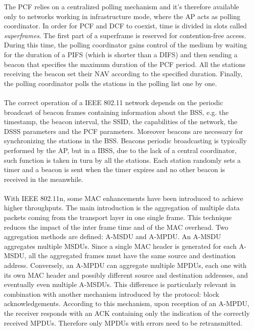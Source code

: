The \gls{PCF} relies on a centralized polling mechanism and it's therefore available only to networks working in infrastructure mode, where the \gls{AP} acts as polling coordinator. In order for \gls{PCF} and \gls{DCF} to coexist, time is divided in slots called \textit{superframes}. The first part of a superframe is reserved for contention-free access. During this time, the polling coordinator gains control of the medium by waiting for the duration of a \gls{PIFS} (which is shorter than a \gls{DIFS}) and then sending a beacon that specifies the maximum duration of the \gls{PCF} period. All the stations receiving the beacon set their \gls{NAV} according to the specified duration. Finally, the polling coordinator polls the stations in the polling list one by one. \\ \\
The correct operation of a IEEE 802.11 network depends on the periodic broadcast of beacon frames containing information about the \gls{BSS}, e.g. the timestamp, the beacon interval, the \gls{SSID}, the capabilities of the network, the \gls{DSSS} parameters and the \gls{PCF} parameters. Moreover beacons are necessary for synchronizing the stations in the \gls{BSS}. Beacons periodic broadcasting is typically performed by the \gls{AP}, but in a \gls{IBSS}, due to the lack of a central coordinator, such function is taken in turn by all the stations. Each station randomly sets a timer and a beacon is sent when the timer expires and no other beacon is received in the meanwhile. \\ \\
With IEEE 802.11n, some MAC enhancements have been introduced to achieve higher throughputs. The main introduction is the aggregation of multiple data packets coming from the transport layer in one single frame. This technique reduces the impact of the inter frame time and of the MAC overhead. Two aggregation methods are defined: \gls{A-MSDU} and \gls{A-MPDU}. An \gls{A-MSDU} aggregates multiple \glspl{MSDU}. Since a single MAC header is generated for each \gls{A-MSDU}, all the aggregated frames must have the same source and destination address. Conversely, an \gls{A-MPDU} can aggregate multiple \glspl{MPDU}, each one with its own MAC header and possibly different source and destination addresses, and eventually even multiple \glspl{A-MSDU}. This difference is particularly relevant in combination with another mechanism introduced by the protocol: block acknowledgements. According to this mechanism, upon reception of an \gls{A-MPDU}, the receiver responds with an ACK containing only the indication of the correctly received \glspl{MPDU}. Therefore only \glspl{MPDU} with errors need to be retransmitted.

